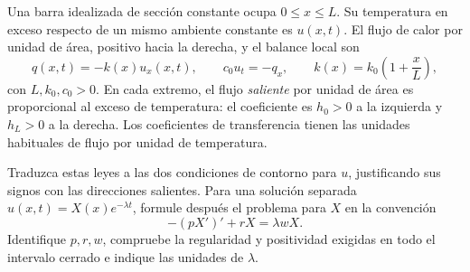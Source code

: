 Una barra idealizada de sección constante ocupa \(0\le x\le L\). Su temperatura en exceso respecto de un mismo ambiente constante es \(u(x,t)\). El flujo de calor por unidad de área, positivo hacia la derecha, y el balance local son
\[
q(x,t)=-k(x)u_x(x,t),\qquad c_0u_t=-q_x,
\qquad k(x)=k_0\left(1+\frac{x}{L}\right),
\]
con \(L,k_0,c_0>0\). En cada extremo, el flujo \emph{saliente} por unidad de área es proporcional al exceso de temperatura: el coeficiente es \(h_0>0\) a la izquierda y \(h_L>0\) a la derecha. Los coeficientes de transferencia tienen las unidades habituales de flujo por unidad de temperatura.

Traduzca estas leyes a las dos condiciones de contorno para \(u\), justificando sus signos con las direcciones salientes. Para una solución separada \(u(x,t)=X(x)e^{-\lambda t}\), formule después el problema para \(X\) en la convención
\[
-(pX')'+rX=\lambda wX.
\]
Identifique \(p,r,w\), compruebe la regularidad y positividad exigidas en todo el intervalo cerrado e indique las unidades de \(\lambda\).
